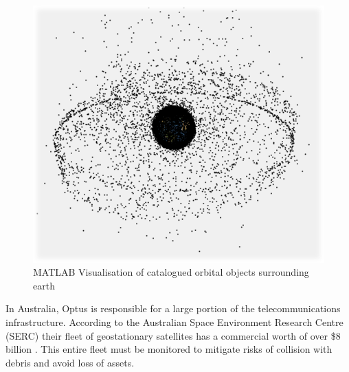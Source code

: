 \documentclass[12pt,openany,a4paper]{book}
\begin{document}
				\begin{figure}[H]
					\centering
					\caption{MATLAB Visualisation of catalogued orbital objects surrounding earth}
					\label{fullCata}
					\includegraphics[scale=0.5]{cata2.png}
				\end{figure}
		
		
		
		
		In Australia, Optus is responsible for a large portion of the telecommunications infrastructure. According to the Australian Space Environment
		Research Centre (SERC) their fleet of geostationary satellites has a commercial worth of over \$8 billion \cite{SERC}. 
		This entire fleet must be monitored to mitigate risks of collision with debris and avoid loss of assets. \newline
		
\end{document}
